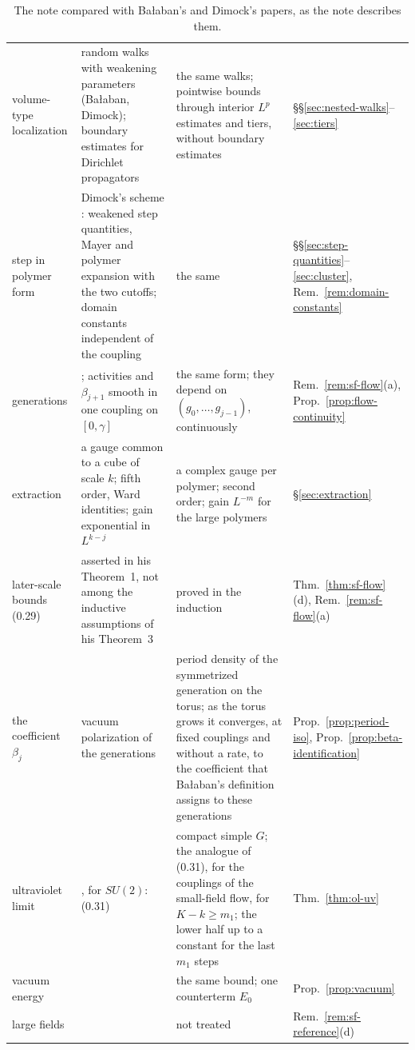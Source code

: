 \begin{table}[tbp]
\begin{tabular}{|p{}|p{}|p{}|p{}|}
\raggedright volume-type localization & \raggedright random walks with weakening parameters (Ba\l aban, Dimock); boundary estimates for Dirichlet propagators \cite{BalGreen,BalPropI,BalBackground} & \raggedright the same walks; pointwise bounds through interior $L^p$ estimates and tiers, without boundary estimates & \raggedright \S\S\ref{sec:nested-walks}--\ref{sec:tiers}\tabularnewline
\raggedright step in polymer form & \raggedright Dimock's scheme \cite{DimockI}: weakened step quantities, Mayer and polymer expansion with the two cutoffs; domain constants independent of the coupling \cite[(1.11)--(1.16)]{BalYM4I} & \raggedright the same & \raggedright \S\S\ref{sec:step-quantities}--\ref{sec:cluster}, Rem.~\ref{rem:domain-constants}\tabularnewline
\raggedright generations & \raggedright \cite[(0.22)--(0.30)]{BalYM4I}; activities and $\beta_{j+1}$ smooth in one coupling on $[0,\gamma]$ & \raggedright the same form; they depend on $(g_0,\dots,g_{j-1})$, continuously & \raggedright Rem.~\ref{rem:sf-flow}(a), Prop.~\ref{prop:flow-continuity}\tabularnewline
\raggedright extraction & \raggedright a gauge common to a cube of scale $k$; fifth order, Ward identities; gain exponential in $L^{k-j}$ \cite[(0.27)]{BalYM4I} & \raggedright a complex gauge per polymer; second order; gain $L^{-m}$ for the large polymers & \raggedright \S\ref{sec:extraction}\tabularnewline
\raggedright later-scale bounds (0.29) & \raggedright asserted in his Theorem~1, not among the inductive assumptions of his Theorem~3 & \raggedright proved in the induction & \raggedright Thm.~\ref{thm:sf-flow}(d), Rem.~\ref{rem:sf-flow}(a)\tabularnewline
\raggedright the coefficient $\beta_j$ & \raggedright vacuum polarization of the generations \cite[(1.20)--(1.22)]{BalYM4I} & \raggedright period density of the symmetrized generation on the torus; as the torus grows it converges, at fixed couplings and without a rate, to the coefficient that Ba\l aban's definition assigns to these generations & \raggedright Prop.~\ref{prop:period-iso}, Prop.~\ref{prop:beta-identification}\tabularnewline
\raggedright ultraviolet limit & \raggedright \cite[Theorem~2]{BalYM4I}, for $SU(2)$: (0.31) & \raggedright compact simple $G$; the analogue of (0.31), for the couplings of the small-field flow, for $K-k\ge m_1$; the lower half up to a constant for the last $m_1$ steps & \raggedright Thm.~\ref{thm:ol-uv}\tabularnewline
\raggedright vacuum energy & \raggedright \cite[Theorem~24]{DimockI} & \raggedright the same bound; one counterterm $E_0$ & \raggedright Prop.~\ref{prop:vacuum}\tabularnewline
\raggedright large fields & \raggedright \cite{DimockII,DimockIII} & \raggedright not treated & \raggedright Rem.~\ref{rem:sf-reference}(d)\tabularnewline
\hline
\end{tabular}
\caption{The note compared with Ba\l aban's and Dimock's papers, as the note describes them.}\label{tab:G-comparison}
\end{table}

